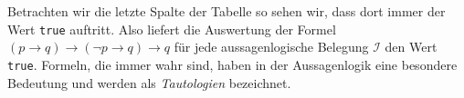 \begin{table}[!ht]
  \centering
{}
  \caption{Berechnung der Wahrheitswerte von $(p \rightarrow q) \rightarrow (\neg p \rightarrow q) \rightarrow q$.}
  \label{tab:tautologie}
\end{table}

Betrachten wir die letzte Spalte der Tabelle so sehen wir, dass dort immer der Wert
\texttt{true} auftritt.  Also liefert die Auswertung der Formel
$(p \rightarrow q) \rightarrow (\neg p \rightarrow q) \rightarrow q $
f\"{u}r jede aussagenlogische Belegung $\mathcal{I}$ den Wert \texttt{true}.  
Formeln, die immer wahr sind, haben in der Aussagenlogik eine besondere Bedeutung und
werden als \emph{Tautologien} bezeichnet.

